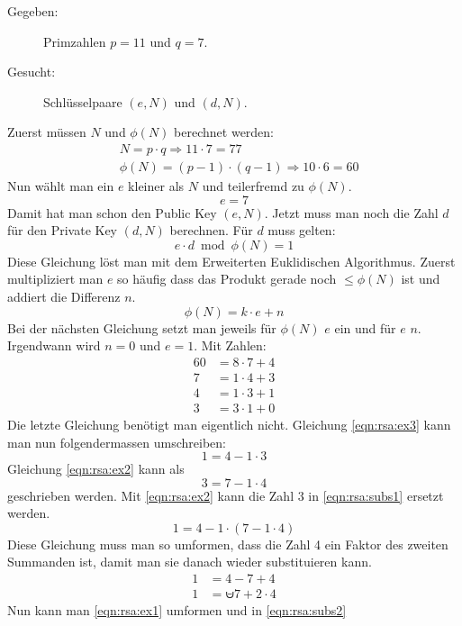 \begin{description}
\item[Gegeben:] Primzahlen $p=11$ und $q=7$.
\item[Gesucht:] Schlüsselpaare $(e,N)$ und $(d,N)$.
\end{description}

Zuerst müssen $N$ und $\phi(N)$ berechnet werden:
\begin{align*}
	& N = p \cdot q \Rightarrow 11 \cdot 7 = 77 \\
	& \phi(N) = (p-1) \cdot (q-1) \Rightarrow 10 \cdot 6 = 60
\end{align*}
Nun wählt man ein $e$ kleiner als $N$ und teilerfremd zu $\phi(N)$.
\[
	e = 7
\]
Damit hat man schon den Public Key $(e,N)$. Jetzt muss man noch die Zahl $d$ für
den Private Key $(d,N)$ berechnen. Für $d$ muss gelten:
\[
	e \cdot d \bmod \phi(N) = 1
\]
Diese Gleichung löst man mit dem Erweiterten Euklidischen Algorithmus. Zuerst
multipliziert man $e$ so häufig dass das Produkt gerade noch $\leq \phi(N)$ ist
und addiert die Differenz $n$.
\[
\phi(N) = k \cdot e + n
\]
Bei der nächsten Gleichung setzt man jeweils für $\phi(N)$ $e$ ein und für $e$
$n$. Irgendwann wird $n=0$ und $e=1$. Mit Zahlen:
\begin{align}
	60 & = 8 \cdot 7 + 4 \label{eqn:rsa:ex1} \\
	7 & = 1 \cdot 4 + 3 \label{eqn:rsa:ex2} \\
	4 & = 1 \cdot 3 + 1 \label{eqn:rsa:ex3} \\
	3 & = 3 \cdot 1 + 0 \label{eqn:rsa:ex4}
\end{align}
Die letzte Gleichung benötigt man eigentlich nicht. Gleichung \ref{eqn:rsa:ex3}
kann man nun folgendermassen umschreiben:
\begin{equation}
\label{eqn:rsa:subs1}
	1 = 4 - 1 \cdot 3
\end{equation}
Gleichung \ref{eqn:rsa:ex2} kann als
\[
	3 = 7 - 1 \cdot 4
\]
geschrieben werden. Mit \eqref{eqn:rsa:ex2} kann die Zahl 3 in
\eqref{eqn:rsa:subs1} ersetzt werden.  
\begin{equation}
	1 = 4 - 1 \cdot (7 - 1 \cdot 4)
\end{equation}
Diese Gleichung muss man so umformen, dass die Zahl 4 ein Faktor des zweiten
Summanden ist, damit man sie danach wieder substituieren kann.
\begin{align}
	1 &= 4 - 7 + 4 \\
	1 &= \uminus 7 + 2 \cdot 4 \label{eqn:rsa:subs2}
\end{align}
Nun kann man \eqref{eqn:rsa:ex1} umformen und in \eqref{eqn:rsa:subs2}
